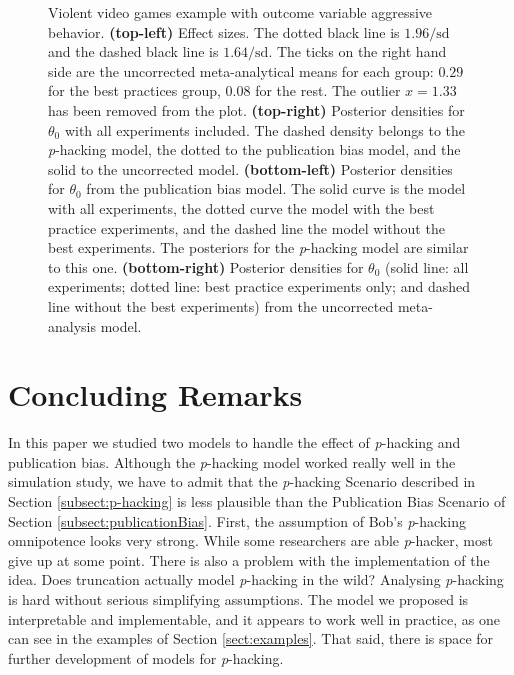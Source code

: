 \documentclass[preprint, authoryear]{elsarticle}
\theoremstyle{plain}
\theoremstyle{definition}
\begin{document}
\begin{figure}
\caption{\label{fig:anderson2010}Violent video games example with outcome variable aggressive behavior. \textbf{(top-left)} Effect sizes. The dotted black line is $1.96/\textrm{sd}$ and the dashed black line is $1.64/\textrm{sd}$. The ticks on the right hand side are the uncorrected meta-analytical means for each group: $0.29$ for the best practices group, $0.08$ for the rest. The outlier $x=1.33$ has been removed from the plot.
\textbf{(top-right)} Posterior densities for $\theta_{0}$ with all experiments included. The dashed density belongs to the \emph{p}-hacking model, the dotted to the publication bias model, and the solid to the uncorrected model. \textbf{(bottom-left)} Posterior densities for $\theta_{0}$ from the publication bias model. The solid curve is the model with all experiments, the dotted curve the model with the best practice experiments, and the dashed line the model without the best experiments. The posteriors for the \emph{p}-hacking model are similar to this one. \textbf{(bottom-right)} Posterior densities for $\theta_{0}$ (solid line: all experiments; dotted line: best practice experiments only; and dashed line without the best experiments) from the uncorrected meta-analysis model.}
\end{figure}

\section{Concluding Remarks}\label{sect:conclusions}

In this paper we studied two models to handle the effect of \emph{p}-hacking and publication bias. Although the \emph{p}-hacking model worked really well in the simulation study, we have to admit that the \emph{p}-hacking Scenario described in Section \ref{subsect:p-hacking} is less plausible than the Publication Bias Scenario of Section \ref{subsect:publicationBias}. First, the assumption of Bob's \emph{p}-hacking omnipotence looks very strong. While some researchers are able \emph{p}-hacker, most give up at some point. There is also a problem with the implementation of the idea. Does truncation actually model \emph{p}-hacking in the wild? Analysing \emph{p}-hacking is hard without serious simplifying assumptions. The model we proposed is interpretable and implementable, and it appears to work well in practice, as one can see in the examples of Section \ref{sect:examples}. That said, there is space for further development of models for \emph{p}-hacking.
\end{document}
